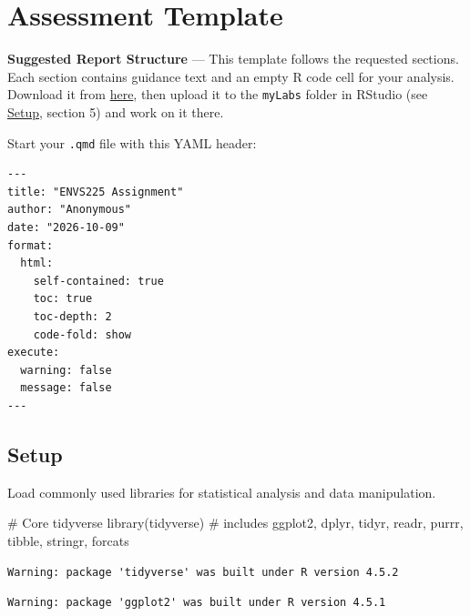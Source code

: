 \documentclass[
  letterpaper,
  DIV=11,
  numbers=noendperiod]{scrreprt}
\newenvironment{Shaded}{\begin{snugshade}}{\end{snugshade}}
\newcommand{\CommentTok}[1]{\textcolor[rgb]{0.37,0.37,0.37}{#1}}
\newcommand{\FunctionTok}[1]{\textcolor[rgb]{0.28,0.35,0.67}{#1}}
\newcommand{\NormalTok}[1]{\textcolor[rgb]{0.00,0.23,0.31}{#1}}
\begin{document}

\chapter*{Assessment Template}\label{assessment-template}


\textbf{Suggested Report Structure} --- This template follows the
requested sections. Each section contains guidance text and an empty R
code cell for your analysis. Download it from
\href{https://canvas.liverpool.ac.uk/courses/93312/files/14479738?module_item_id=2727711}{here},
then upload it to the \texttt{myLabs} folder in RStudio (see
\hyperref[setup-rstudio-in-your-browser]{Setup}, section 5) and work on
it there.

Start your \texttt{.qmd} file with this YAML header:

\begin{verbatim}
---
title: "ENVS225 Assignment"
author: "Anonymous"
date: "2026-10-09"
format:
  html:
    self-contained: true
    toc: true
    toc-depth: 2
    code-fold: show
execute:
  warning: false
  message: false
---
\end{verbatim}

\section*{Setup}\label{setup}


Load commonly used libraries for statistical analysis and data
manipulation.

\begin{Shaded}
\begin{Highlighting}[]
\CommentTok{\# Core tidyverse}
\FunctionTok{library}\NormalTok{(tidyverse)    }\CommentTok{\# includes ggplot2, dplyr, tidyr, readr, purrr, tibble, stringr, forcats}
\end{Highlighting}
\end{Shaded}

\begin{verbatim}
Warning: package 'tidyverse' was built under R version 4.5.2
\end{verbatim}

\begin{verbatim}
Warning: package 'ggplot2' was built under R version 4.5.1
\end{verbatim}
\end{document}
